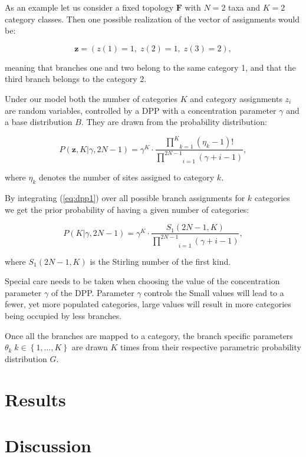 As an example let us consider a fixed topology $\mathbf{F}$ with $N=2$ taxa and $K=2$ category classes.
Then one possible realization of the vector of assignments would be:

$$\mathbf{z}=\left(z(1)=1,\; z(2)=1,\; z(3)=2\right),$$
 
\noindent
meaning that branches one and two belong to the same category 1, and that the third branch belongs to the category 2.

Under our model both the number of categories $K$ and category assignments $z_{i}$ are random variables, controlled by a DPP with a concentration parameter $\gamma$ and a base distribution $B$.
They are drawn from the probability distribution:

\begin{equation}
P(\mathbf{z},K|\gamma,2N-1)=\gamma^{K}\cdot\frac{\underset{k=1}{\overset{K}{\prod}}\left(\eta_{k}-1\right)!}{\underset{i=1}{\overset{2N-1}{\prod}}\left(\gamma+i-1\right)},
\label{eq:dpp1} 
\end{equation} 
 
\noindent 
where $\eta_{k}$ denotes the number of sites assigned to category $k$.

By integrating (\ref{eq:dpp1}) over all possible branch assignments for $k$ categories we get the prior probability of having a given number of categories:

\begin{equation}
P(K|\gamma,2N-1)=\gamma^{K}\cdot\frac{S_{1}(2N-1,K)}{\underset{i=1}{\overset{2N-1}{\prod}}\left(\gamma+i-1\right)},
\label{eq:dpp2} 
\end{equation} 

\noindent
where $S_{1}(2N-1,K)$ is the Stirling number of the first kind. 


Special care needs to be taken when choosing the value of the concentration parameter $\gamma$ of the DPP. 
Parameter $\gamma$ controls the 
Small values will lead to a fewer, yet more populated categories, large values will result in more categories being occupied by less branches.

Once all the branches are mapped to a category, the branch specific parameters $\theta_{k}\; k\in\left\{ 1,\ldots,K\right\}$ are drawn $K$ times from their respective parametric probability distribution $G$.


\section{Results}




\section{Discussion}



